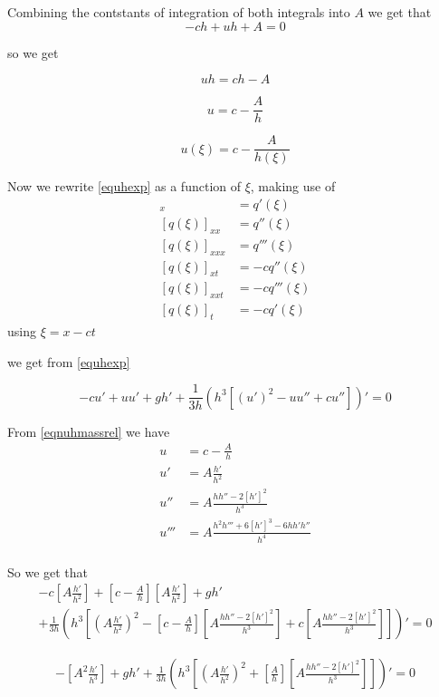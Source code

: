 \documentclass[subeqn]{article}
\begin{document}
Combining the contstants of integration of both integrals into $A$ we get that
\[ -ch + uh + A = 0  \]

so we get

\[ uh = ch - A  \]

\[ u = c - \frac{A}{h}  \]

\begin{equation}
\label{eqnuhmassrel}
u(\xi) = c - \frac{A}{h(\xi)} 
\end{equation}

Now we rewrite \eqref{equhexp} as a function of $\xi$, making use of 
\begin{align*}
[q(\xi)]_x &= q'(\xi) \\
[q(\xi)]_{xx} &= q''(\xi) \\
[q(\xi)]_{xxx} &= q'''(\xi) \\
[q(\xi)]_{xt} &= -c q''(\xi) \\
[q(\xi)]_{xxt} &= -c q'''(\xi) \\
[q(\xi)]_t &= -c q'(\xi)
\end{align*}
using $\xi = x - ct$

we get from \eqref{equhexp}

\[	-cu' +  u u'  + gh' + \frac{1}{3h} \left({h^3}\left[\left(u' \right)^2 - uu'' + c u'' \right]\right)' = 0\]

From \eqref{eqnuhmassrel} we have
\begin{align*}
u &= c - \frac{A}{h} \\
u' &= A \frac{h'}{h^2} \\
u'' &= A \frac{h h'' - 2\left[h'\right]^2}{h^3} \\
u''' &= A \frac{h^2 h''' + 6 \left[h'\right]^3 - 6hh'h''}{h^4} \\
\end{align*}

So we get that
\begin{multline*}
-c\left[A \frac{h'}{h^2}\right] + \left[ c - \frac{A}{h}\right] \left[A \frac{h'}{h^2}\right]  + gh' \\ + \frac{1}{3h} \left({h^3}\left[\left(A \frac{h'}{h^2} \right)^2 - \left[ c - \frac{A}{h}\right]\left[A \frac{h h'' - 2\left[h'\right]^2}{h^3}\right] + c \left[A \frac{h h'' - 2\left[h'\right]^2}{h^3}\right] \right]\right)' = 0 \end{multline*}

\begin{multline*}
-\left[A^2 \frac{h'}{h^3}\right]  + gh'  + \frac{1}{3h} \left({h^3}\left[\left(A \frac{h'}{h^2} \right)^2 + \left[ \frac{A}{h}\right]\left[A \frac{h h'' - 2\left[h'\right]^2}{h^3}\right] \right]\right)' = 0 \end{multline*}
\end{document}
